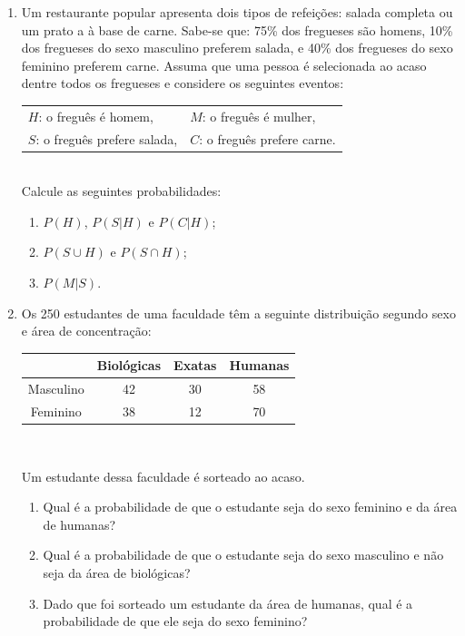 \documentclass{article}
\begin{document}
\begin{enumerate}
   	\item Um restaurante popular apresenta dois tipos de refeições: salada completa ou um prato a à base de carne. Sabe-se que: 75\%  dos fregueses são homens, 10\% dos fregueses do sexo masculino preferem salada, e 40\% dos fregueses do sexo feminino preferem carne. Assuma que uma pessoa é selecionada ao acaso dentre todos os fregueses e considere os seguintes eventos:\\
   	\begin{tabular}{ll}
   		$H$: o freguês é homem, & $M$: o freguês é mulher,\\
   		$S$: o freguês prefere salada, & $C$: o freguês prefere carne.\\
   	\end{tabular}\\
   	Calcule as seguintes probabilidades:
   	\begin{enumerate}
   		\item $P(H)$, $P(S|H)$ e $P(C|H)$;
   		\item $P(S \cup H)$ e $P(S \cap H)$;
   		\item $P(M|S)$.
   	\end{enumerate}
   	
   	\item Os 250 estudantes de uma faculdade têm a seguinte distribuição segundo sexo e área de concentração:\\	
   	\begin{center}
   	\begin{tabular}{c|ccc}
   	\hline
   	  & Biológicas & Exatas & Humanas \\
   	\hline
   	Masculino & 42 & 30 & 58 \\
   	Feminino  & 38 & 12 & 70 \\
   	\hline
   	\end{tabular}\\
   	\end{center}
   		Um estudante dessa faculdade é sorteado ao acaso.
   		\begin{enumerate}
   			\item Qual é a probabilidade de que o estudante seja do sexo feminino e da área de humanas?
   			\item Qual é a probabilidade de que o estudante seja do sexo masculino e não seja da área de biológicas?
   			\item Dado que foi sorteado um estudante da área de humanas, qual é a probabilidade de que ele seja do sexo feminino?
   		\end{enumerate}
    

\end{enumerate}
\end{document}
